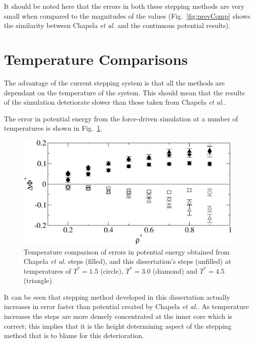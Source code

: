 \documentclass[12pt]{UoAthesis} \usepackage{booktabs}
\begin{document}
It should be noted here that the errors in both these stepping methods
are very small when compared to the magnitudes of the values
(Fig.~\ref{fig:prevComp} shows the similarity between Chapela
\textit{et al.} and the continuous potential results).
\section{Temperature Comparisons}
\label{sec:tempcomp}
The advantage of the current stepping system is that all the methods
are dependant on the temperature of the system.  This should mean that
the results of the simulation deteriorate slower than those taken
from Chapela \textit{et al.}.

The error in potential energy from the force-driven simulation at a
number of temperatures is shown in Fig.~\ref{fig:tempU}.

\begin{figure}[htp] 
  \begin{center}
    \includegraphics[clip,scale=0.45]{figures/TempU} 
    \caption[Temperature comparison of potential energy between
    previous steps and this dissertations steps]
    {\label{fig:tempU} Temperature comparison of errors in potential
      energy obtained from Chapela \textit{et al.} steps (filled), and
      this dissertation's steps (unfilled) at temperatures of
      $T^*=1.5$ (circle), $T^*=3.0$ (diamond) and $T^*=4.5$
      (triangle).}
    \end{center}
\end{figure}

It can be seen that stepping method developed in this dissertation
actually increases in error faster than potential created by Chapela
\textit{et al.}.  As temperature increases the steps are more densely
concentrated at the inner core which is correct; this implies that it
is the height determining aspect of the stepping method that is to
blame for this deterioration. 
\end{document}
